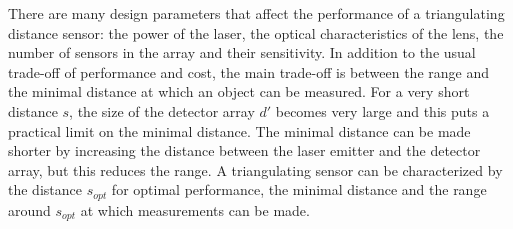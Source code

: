 There are many design parameters that affect the performance of a triangulating distance sensor: the power of the laser, the optical characteristics of the lens, the number of sensors in the array and their sensitivity. In addition to the usual trade-off of performance and cost, the main trade-off is between the range and the minimal distance at which an object can be measured. For a very short distance $s$, the size of the detector array $d'$ becomes very large and this puts a practical limit on the minimal distance. The minimal distance can be made shorter by increasing the distance between the laser emitter and the detector array, but this reduces the range. A triangulating sensor can be characterized by the distance $s_{\textit{opt}}$ for optimal performance, the minimal distance and the range around $s_{\textit{opt}}$ at which measurements can be made.

